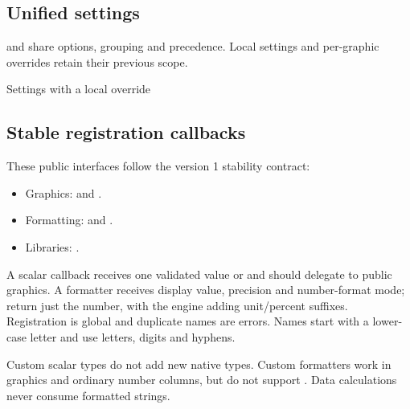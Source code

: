 \subsection{Unified settings}
\key{\gradbarsset} and \key{\gradbarssetup} share options, grouping and precedence.
Local settings and per-graphic overrides retain their previous scope.
\begin{demo}{Settings with a local override}
{}
\end{demo}
\subsection{Stable registration callbacks}
These public interfaces follow the version 1 stability contract:
\begin{itemize}
\item Graphics: \key{\gradbarsdeclaretype} and \key{\gradgraphic}.
\item Formatting: \key{\gradbarsdeclareformatter} and \key{\gradbarsformatnumber}.
\item Libraries: \key{\gradbarsdeclarelibrary}.
\end{itemize}
A scalar callback receives one validated value or 
and should delegate to public graphics. A formatter receives display value,
precision and number-format mode; return just the number, with the engine adding
unit/percent suffixes. Registration is global and duplicate names are errors.
Names start with a lower-case letter and use letters, digits and hyphens.
\begin{source}
\end{source}
Custom scalar types do not add new native  types. Custom formatters
work in graphics and ordinary number columns, but do not support
. Data calculations never consume formatted strings.
